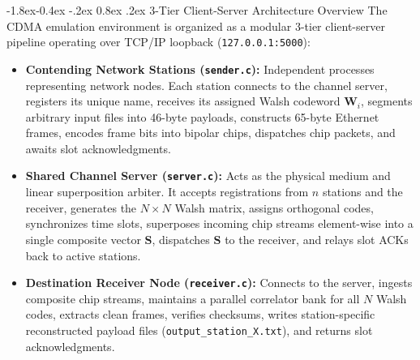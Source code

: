 \documentclass[11pt,a4paper]{article}
\makeatletter
\renewcommand\subsection{\@startsection{subsection}{2}{\z@}%
                                     {-1.8ex\@plus -0.4ex \@minus -.2ex}%
                                     {0.8ex \@plus .2ex}%
                                     {\normalfont\large\bfseries}}
\makeatother
\begin{document}
\subsection{3-Tier Client-Server Architecture Overview}
The CDMA emulation environment is organized as a modular 3-tier client-server pipeline operating over TCP/IP loopback (\texttt{127.0.0.1:5000}):
\begin{itemize}
    \item \textbf{Contending Network Stations (\texttt{sender.c}):} Independent processes representing network nodes. Each station connects to the channel server, registers its unique name, receives its assigned Walsh codeword $\mathbf{W}_i$, segments arbitrary input files into 46-byte payloads, constructs 65-byte Ethernet frames, encodes frame bits into bipolar chips, dispatches chip packets, and awaits slot acknowledgments.
    \item \textbf{Shared Channel Server (\texttt{server.c}):} Acts as the physical medium and linear superposition arbiter. It accepts registrations from $n$ stations and the receiver, generates the $N \times N$ Walsh matrix, assigns orthogonal codes, synchronizes time slots, superposes incoming chip streams element-wise into a single composite vector $\mathbf{S}$, dispatches $\mathbf{S}$ to the receiver, and relays slot ACKs back to active stations.
    \item \textbf{Destination Receiver Node (\texttt{receiver.c}):} Connects to the server, ingests composite chip streams, maintains a parallel correlator bank for all $N$ Walsh codes, extracts clean frames, verifies checksums, writes station-specific reconstructed payload files (\texttt{output\_station\_X.txt}), and returns slot acknowledgments.
\end{itemize}
\end{document}
